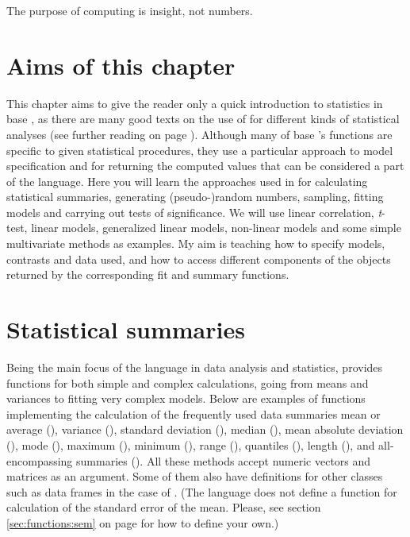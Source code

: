 \documentclass[krantz2]{krantz}\usepackage{knitr}
\begin{document}
\begin{VF}
The purpose of computing is insight, not numbers.

\nocite{Hamming1987}
\end{VF}

\section{Aims of this chapter}

This chapter aims to give the reader only a quick introduction to statistics in base \Rlang, as there are many good texts on the use of \Rpgrm for different kinds of statistical analyses (see further reading on page \pageref{sec:stat:further:reading}). Although many of base \R's functions are specific to given statistical procedures, they use a particular approach to model specification and for returning the computed values that can be considered a part of the \Rlang language. Here you will learn the approaches used in \Rlang for calculating statistical summaries, generating (pseudo-)random numbers, sampling, fitting models and carrying out tests of significance. We will use linear correlation, \emph{t}-test, linear models, generalized linear models, non-linear models and some simple multivariate methods as examples. My aim is teaching how to specify models, contrasts and data used, and how to access different components of the objects returned by the corresponding fit and summary functions.


\section{Statistical summaries}
%
Being the main focus of the \Rlang language in data analysis and statistics, \Rlang provides functions for both simple and complex calculations, going from means and variances to fitting very complex models. Below are examples of functions implementing the calculation of the frequently used data summaries mean or average (), variance (), standard deviation (), median (), mean absolute deviation (), mode (), maximum (), minimum (), range (), quantiles (), length (), and all-encompassing summaries (). All these methods accept numeric vectors and matrices as an argument. Some of them also have definitions for other classes such as data frames in the case of . (The \Rlang language does not define a function for calculation of the standard error of the mean. Please, see section \ref{sec:functions:sem} on page \pageref{sec:functions:sem} for how to define your own.)
\end{document}

